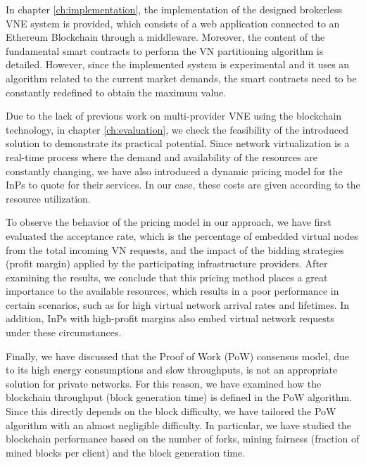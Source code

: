 In chapter \ref{ch:implementation}, the implementation of the designed brokerless VNE system is provided, which consists of a web application connected to an Ethereum Blockchain through a middleware. Moreover, the content of the fundamental smart contracts to perform the VN partitioning algorithm is detailed. However, since the implemented system is experimental and it uses an algorithm related to the current market demands, the smart contracts need to be constantly redefined to obtain the maximum value.

Due to the lack of previous work on multi-provider VNE using the blockchain technology, in chapter \ref{ch:evaluation}, we check the feasibility of the introduced solution to demonstrate its practical potential. Since network virtualization is a real-time process where the demand and availability of the resources are constantly changing, we have also introduced a dynamic pricing model for the InPs to quote for their services. In our case, these costs are given according to the resource utilization.

To observe the behavior of the pricing model in our approach, we have first evaluated the acceptance rate, which is the percentage of embedded virtual nodes from the total incoming VN requests, and the impact of the bidding strategies (profit margin) applied by the participating infrastructure providers. After examining the results, we conclude that this pricing method places a great importance to the available resources, which results in a poor performance in certain scenarios, such as for high virtual network arrival rates and lifetimes. In addition, InPs with high-profit margins also embed virtual network requests under these circumstances.

Finally, we have discussed that the Proof of Work (PoW) consensus model, due to its high energy consumptions and slow throughputs, is not an appropriate solution for private networks. For this reason, we have examined how the blockchain throughput (block generation time) is defined in the PoW algorithm. Since this directly depends on the block difficulty, we have tailored the PoW algorithm with an almost negligible difficulty. In particular, we have studied the blockchain performance based on the number of forks, mining fairness (fraction of mined blocks per client) and the block generation time.

